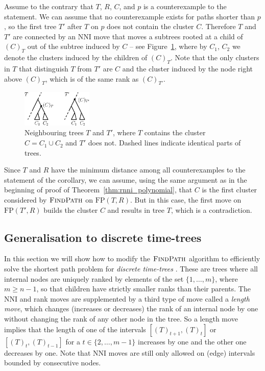 \documentclass[11pt]{amsart}
\newcommand{\findpath}{\textsc{FindPath}}
\newcommand{\nni}{\mathrm{NNI}}
\newcommand{\fp}{\mathrm{FP}}
\newcommand{\summary}[1]{} %
\begin{document}
\proof
Assume to the contrary that $T$, $R$, $C$, and $p$ is a counterexample to the statement.
We can assume that no counterexample exists for paths shorter than $p$, so the first tree $T'$ after $T$ on $p$ does not contain the cluster $C$.
Therefore $T$ and $T'$ are connected by an $\nni$ move that moves a subtrees rooted at a child of $(C)_T$ out of the subtree induced by $C$ -- see Figure~\ref{fig:cluster_thm_proof}, where by $C_1$, $C_2$ we denote the clusters induced by the children of $(C)_T$.
Note that the only clusters in $T$ that distinguish $T$ from $T'$ are $C$ and the cluster induced by the node right above $(C)_{T}$, which is of the same rank as $(C)_{T'}$.

\begin{figure}[ht]
\centering
\includegraphics[width=0.3\textwidth]{cluster_thm_proof}
\caption{Neighbouring trees $T$ and $T'$, where $T$ contains the cluster $C = C_1 \cup C_2$ and $T'$ does not.
Dashed lines indicate identical parts of trees.}
\label{fig:cluster_thm_proof}
\end{figure}

Since $T$ and $R$ have the minimum distance among all counterexamples to the statement of the corollary, we can assume, using the same argument as in the beginning of proof of Theorem~\ref{thm:rnni_polynomial}, that $C$ is the first cluster considered by $\findpath$ on $\fp(T, R)$.
But in this case, the first move on $\fp(T',R)$ builds the cluster $C$ and results in tree $T$, which is a contradiction.
\endproof

\subsection{Generalisation to discrete time-trees}

\summary{Generalising $\findpath$ for discrete time-trees}
In this section we will show how to modify the $\findpath$ algorithm to efficiently solve the shortest path problem for \emph{discrete time-trees} \autocite{Gavryushkin2018-ol}.
These are trees where all internal nodes are uniquely ranked by elements of the set $\{1, \ldots, m\}$, where $m \geq n - 1$, so that children have strictly smaller ranks than their parents.
The NNI and rank moves are supplemented by a third type of move called a \emph{length move}, which changes (increases or decreases) the rank of an internal node by one without changing the rank of any other node in the tree.
So a length move implies that the length of one of the intervals $[(T)_{t+1},(T)_t]$ or $[(T)_t,(T)_{t-1}]$ for a $t \in \{2, \ldots, m-1\}$ increases by one and the other one decreases by one.
Note that $\nni$ moves are still only allowed on (edge) intervals bounded by consecutive nodes.
\end{document}
